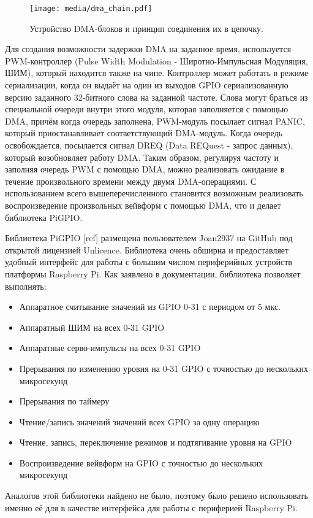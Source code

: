 \documentclass[14pt,russian,a4paper]{extarticle}
\newcommand{\gb}[1]{\guillemotleft #1\guillemotright}
\newcounter{subsubsubsection}[subsubsection]
\begin{document}
\begin{figure}[h!]
    \centerline{\texttt{[image: media/dma\_chain.pdf]}}
    \caption{Устройство DMA-блоков и принцип соединения их в цепочку.}
    \label{fig:dma_chain}
\end{figure}

Для создания возможности задержки DMA на заданное время, используется PWM-контроллер (Pulse Width Modulation - Широтно-Импульсная Модуляция, ШИМ), который находится также на чипе. Контроллер может работать в режиме сериализации, когда он выдаёт на один из выходов GPIO сериализованную версию заданного 32-битного слова на заданной частоте. Слова могут браться из специальной очереди внутри этого модуля, которая заполняется с помощью DMA, причём когда очередь заполнена, PWM-модуль посылает сигнал PANIC, который приостанавливает соответствующий DMA-модуль. Когда очередь освобождается, посылается сигнал DREQ (Data REQuest - запрос данных), который возобновляет работу DMA. Таким образом, регулируя частоту и заполняя очередь PWM с помощью DMA, можно реализовать ожидание в течение произвольного времени между двумя DMA-операциями.
С использованием всего вышеперечисленного становится возможным реализовать воспроизведение произвольных вейвформ с помощью DMA, что и делает библиотека PiGPIO.

Библиотека PiGPIO [ref] размещена пользователем Joan2937 на GitHub под открытой лицензией \gb{Unlicence}. Библиотека очень обширна и предоставляет удобный интерфейс для работы с большим числом периферийных устройств платформы Raspberry Pi. Как заявлено в документации, библиотека позволяет выполнять:
\begin{itemize}
    \item Аппаратное считывание значений из GPIO 0-31 с периодом от 5 мкс.
    \item Аппаратный ШИМ на всех 0-31 GPIO
    \item Аппаратные серво-импульсы на всех 0-31 GPIO
    \item Прерывания по изменению уровня на 0-31 GPIO с точностью до нескольких микросекунд
    \item Прерывания по таймеру
    \item Чтение/запись значений значений всех GPIO за одну операцию
    \item Чтение, запись, переключение режимов и подтягивание уровня на GPIO
    \item Воспроизведение вейвформ на GPIO с точностью до нескольких микросекунд
\end{itemize}
Аналогов этой библиотеки найдено не было, поэтому было решено использовать именно её для в качестве интерфейса для работы с периферией Raspberry Pi.
\end{document}
